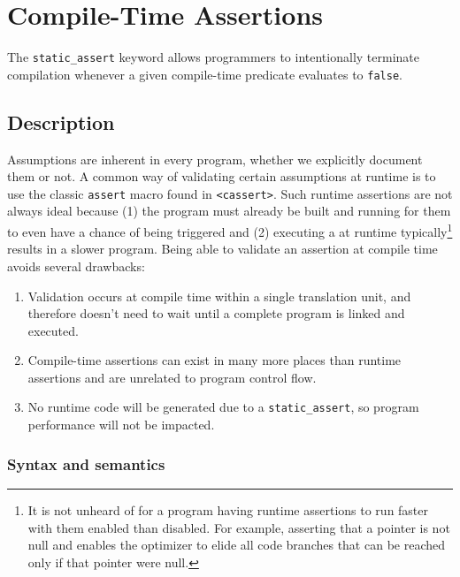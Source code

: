\newpage
\section[{\tt static\_assert}]{Compile-Time Assertions}\label{compile-time-assertions-(static_assert)}



The \lstinline!static_assert! keyword allows programmers to intentionally terminate compilation whenever a given compile-time predicate
evaluates to \lstinline!false!.

\subsection[Description]{Description}\label{description}

Assumptions are
inherent in every program, whether we explicitly document them or not. A common way of validating certain
assumptions at runtime is to use the classic \lstinline!assert! macro found
in \lstinline!<cassert>!. Such runtime assertions are not always ideal
because (1) the program must already be built and running for them to
even have a chance of being triggered and (2) executing a
 at runtime typically{\cprotect\footnote{It is
not unheard of for a program having runtime assertions to run faster with them
enabled than disabled. For example, asserting that a pointer is not
null and enables the optimizer to elide all code branches that
can be reached only if that pointer were null.}} results in a slower
program. Being able to validate an assertion at compile time avoids
several drawbacks:

\begin{enumerate}
\item{Validation occurs at compile time within a single translation unit, and therefore doesn’t need to wait until a complete program is linked and executed.}
\item{Compile-time assertions can exist in many more places than runtime assertions and are unrelated to program control flow.}
\item{No runtime code will be generated due to a \lstinline!static_assert!, so program performance will not be impacted.}
\end{enumerate}

\subsubsection[Syntax and semantics]{Syntax and semantics}\label{syntax-and-semantics}

